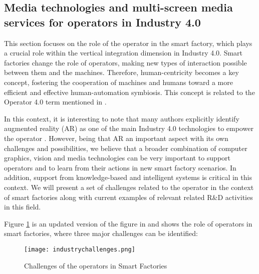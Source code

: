 \subsection{Media technologies and multi-screen media services for operators in Industry 4.0}
This section focuses on the role of the operator in the smart factory, which plays a crucial role within the vertical integration dimension in Industry 4.0. Smart factories change the role of operators, making new types of interaction possible between them and the machines. Therefore, human-centricity becomes a key concept, fostering the cooperation of machines and humans toward a more efficient and effective human-automation symbiosis. This concept is related to the Operator 4.0 term mentioned in \cite{romero2016operator}.

In this context, it is interesting to note that many authors explicitly identify augmented reality (AR) as one of the main Industry 4.0 technologies to empower the operator \cite{funk2016motioneap}. However, being that AR an important aspect with its own challenges and possibilities, we believe that a broader combination of computer graphics, vision and media technologies can be very important to support operators and to learn from their actions in new smart factory scenarios. In addition, support from knowledge-based and intelligent systems is critical in this context. We will present a set of challenges related to the operator in the context of smart factories along with current examples of relevant related R\&D activities in this field. 

Figure \ref{fig:industrycha} is an updated version of the figure in \cite{posada2018graphics} and shows the role of operators in smart factories, where three major challenges can be identified:
\begin{figure}
	\begin{center}
		\texttt{[image: industrychallenges.png]}
		\caption{Challenges of the operators in Smart Factories}
		\label{fig:industrycha}
	\end{center}
\end{figure}

